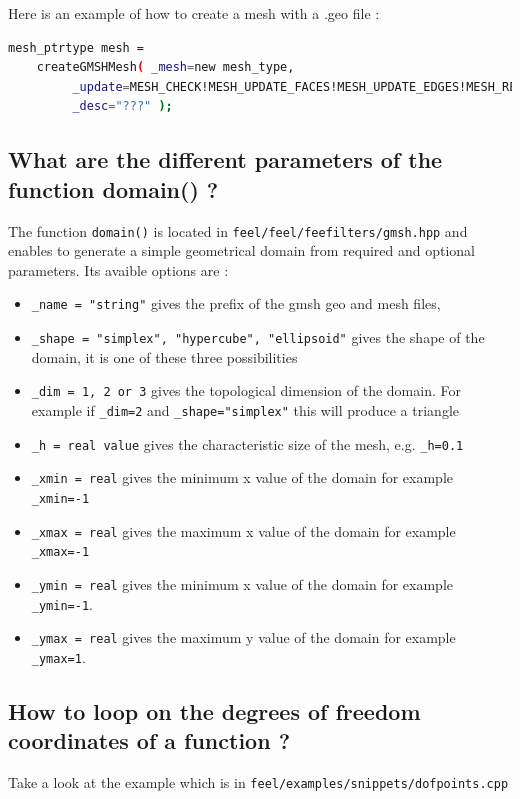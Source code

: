 Here is an example of how to create a mesh with a .geo file :
\begin{lstlisting}[language=sh]
 mesh_ptrtype mesh =
	createGMSHMesh( _mesh=new mesh_type,
         _update=MESH_CHECK!MESH_UPDATE_FACES!MESH_UPDATE_EDGES!MESH_RENUMBER,
         _desc="???" );
\end{lstlisting}


\subsection{What are the different parameters of the function domain() ?}
The function \lstinline!domain()! is located in \lstinline!feel/feel/feefilters/gmsh.hpp! and enables to generate a simple geometrical domain from required and optional parameters. Its avaible options are :
\begin{itemize}
\item \lstinline!_name = "string"! gives the prefix of the gmsh geo and mesh files,
\item \lstinline!_shape = "simplex", "hypercube", "ellipsoid"! gives the shape of the domain, it is one of these three possibilities
\item \lstinline!_dim = 1, 2 or 3! gives the topological dimension of the domain. For example if \lstinline!_dim=2! and \lstinline!_shape="simplex"! this will produce a triangle
\item \lstinline!_h = real value! gives the characteristic size of the mesh, e.g. \lstinline!_h=0.1!
\item \lstinline!_xmin = real! gives the minimum x value of the domain for example \lstinline!_xmin=-1!
\item \lstinline!_xmax = real! gives the maximum x value of the domain for example \lstinline!_xmax=-1!
\item \lstinline!_ymin = real! gives the minimum x value of the domain for example \lstinline!_ymin=-1!.
\item \lstinline!_ymax = real!  gives the maximum y value of the domain for example \lstinline!_ymax=1!.

\end{itemize}


\subsection{How to loop on the degrees of freedom coordinates of a function ?}

Take a look at the example which is in \lstinline!feel/examples/snippets/dofpoints.cpp!


